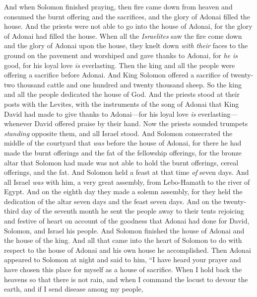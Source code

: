 \begin{biblechapter} %
 And when Solomon finished praying, then fire came down from heaven and consumed the burnt offering and the sacrifices, and the glory of Adonai filled the house.
\verse And the priests were not able to go into the house of Adonai, for the glory of Adonai had filled the house.
\verse When all the \textit{Israelites} saw the fire come down and the glory of Adonai upon the house, they knelt down \textit{with their} faces to the ground on the pavement and worshiped and gave thanks to Adonai, for \textit{he is} good, for his loyal love \textit{is} everlasting.
 Then the king and all the people were offering a sacrifice before Adonai.
\verse And King Solomon offered a sacrifice of twenty-two thousand cattle and one hundred and twenty thousand sheep. So the king and all the people dedicated the house of God.
\verse And the priests stood at their posts with the Levites, with the instruments of the song of Adonai that King David had made to give thanks to Adonai—for his loyal love \textit{is} everlasting—whenever David offered praise by their hand. Now the priests sounded trumpets \textit{standing} opposite them, and all Israel stood.
\verse And Solomon consecrated the middle of the courtyard that \textit{was} before the house of Adonai, for there he had made the burnt offerings and the fat of the fellowship offerings, for the bronze altar that Solomon had made was not able to hold the burnt offerings, cereal offerings, and the fat.
\verse And Solomon held a feast at that time \textit{of} seven days. And all Israel \textit{was} with him, a very great assembly, from Lebo-Hamath to the river of Egypt.
\verse And on the eighth day they made a solemn assembly, for they held the dedication of the altar seven days and the feast seven days.
\verse And on the twenty-third day of the seventh month he sent the people away to their tents rejoicing and festive of heart on account of the goodness that Adonai had done for David, Solomon, and Israel his people.
\verse And Solomon finished the house of Adonai and the house of the king. And all that came into the heart of Solomon to do with respect to the house of Adonai and his own house he accomplished.
 Then Adonai appeared to Solomon at night and said to him, “I have heard your prayer and have chosen this place for myself as a house of sacrifice.
\verse When I hold back the heavens so that there is not rain, and when I command the locust to devour the earth, and if I send disease among my people,

\end{biblechapter}

